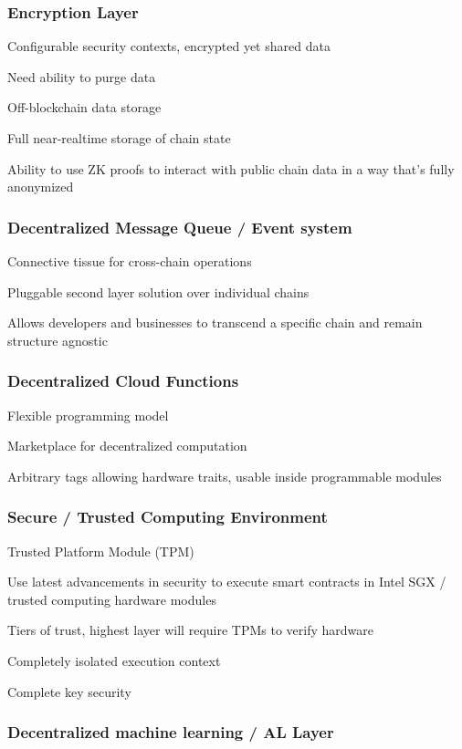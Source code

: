 \documentclass[11pt]{article}
\begin{document}
\subsubsection{Encryption Layer}

Configurable security contexts, encrypted yet shared data


Need ability to purge data


Off-blockchain data storage


Full near-realtime storage of chain state


Ability to use ZK proofs to interact with public chain data in a way that's fully anonymized


\subsubsection{Decentralized Message Queue / Event system}

Connective tissue for cross-chain operations


Pluggable second layer solution over individual chains


Allows developers and businesses to transcend a specific chain and remain structure agnostic


\subsubsection{Decentralized Cloud Functions}

Flexible programming model


Marketplace for decentralized computation


Arbitrary tags allowing hardware traits, usable inside programmable modules


\subsubsection{Secure / Trusted Computing Environment}

Trusted Platform Module (TPM)


Use latest advancements in security to execute smart contracts in Intel SGX / trusted computing hardware modules


Tiers of trust, highest layer will require TPMs to verify hardware


Completely isolated execution context


Complete key security


\subsubsection{Decentralized machine learning / AL Layer}
\end{document}
